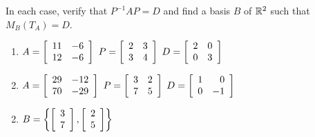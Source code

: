 \begin{multicols}{2}
\begin{ex}
\begin{sol}
\begin{enumerate}[label={\alph*.}]
\end{enumerate}
\end{sol}
\end{ex}

\begin{ex}
In each case, verify that $P^{-1}AP = D$ and find a basis $B$ of $\mathbb{R}^2$ such that $M_{B}(T_{A}) = D$.


\begin{enumerate}[label={\alph*.}]
\item $A = \left[ \begin{array}{rr} 11 & -6 \\ 12 & -6 \end{array} \right]$ $P = \left[ \begin{array}{rr} 2 & 3 \\ 3 & 4 \end{array} \right]$ $D = \left[ \begin{array}{rr} 2 & 0 \\ 0 & 3 \end{array} \right]$


\item $A = \left[ \begin{array}{rr} 29 & -12 \\ 70 & -29 \end{array} \right]$ $P = \left[ \begin{array}{rr} 3 & 2 \\ 7 & 5 \end{array} \right]$ $D = \left[ \begin{array}{rr} 1 & 0 \\ 0 & -1 \end{array} \right]$


\end{enumerate}
\begin{sol}
\begin{enumerate}[label={\alph*.}]
\setcounter{enumi}{1}
\item $B = \left\{ \left[ \begin{array}{c} 3 \\ 7 \end{array} \right], \left[ \begin{array}{c} 2 \\ 5 \end{array} \right] \right\}$


\end{enumerate}
\end{sol}
\end{ex}


\end{multicols}
